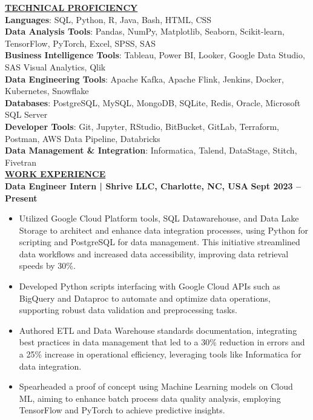 \documentclass{article}
\begin{document}
\noindent \textbf{\underline{TECHNICAL PROFICIENCY}} \\
\textbf{Languages}{: \small SQL, Python, R, Java, Bash, HTML, CSS} \\
\textbf{Data Analysis Tools}{: \small Pandas, NumPy, Matplotlib, Seaborn, Scikit-learn, TensorFlow, PyTorch, Excel, SPSS, SAS} \\
\textbf{Business Intelligence Tools}{: \small Tableau, Power BI, Looker, Google Data Studio, SAS Visual Analytics, Qlik} \\
\textbf{Data Engineering Tools}{: \small Apache Kafka, Apache Flink, Jenkins, Docker, Kubernetes, Snowflake} \\
\textbf{Databases}{: \small PostgreSQL, MySQL, MongoDB, SQLite, Redis, Oracle, Microsoft SQL Server} \\
\textbf{Developer Tools}{: \small Git, Jupyter, RStudio, BitBucket, GitLab, Terraform, Postman, AWS Data Pipeline, Databricks} \\
\textbf{Data Management \& Integration}{: \small Informatica, Talend, DataStage, Stitch, Fivetran} \\


\noindent \textbf{\underline{WORK EXPERIENCE}}\\
\noindent \textbf{Data Engineer Intern | Shrive LLC, Charlotte, NC, USA} \hfill \textbf{Sept 2023 – Present}
\begin{itemize}[noitemsep,nolistsep,leftmargin=*]
\item {\small Utilized Google Cloud Platform tools, SQL Datawarehouse, and Data Lake Storage to architect and enhance data integration processes, using Python for scripting and PostgreSQL for data management. This initiative streamlined data workflows and increased data accessibility, improving data retrieval speeds by 30\%.}
\item {\small Developed Python scripts interfacing with Google Cloud APIs such as BigQuery and Dataproc to automate and optimize data operations, supporting robust data validation and preprocessing tasks.}
\item {\small Authored ETL and Data Warehouse standards documentation, integrating best practices in data management that led to a 30\% reduction in errors and a 25\% increase in operational efficiency, leveraging tools like Informatica for data integration.}
\item {\small Spearheaded a proof of concept using Machine Learning models on Cloud ML, aiming to enhance batch process data quality analysis, employing TensorFlow and PyTorch to achieve predictive insights.}
\end{itemize}
\end{document}
